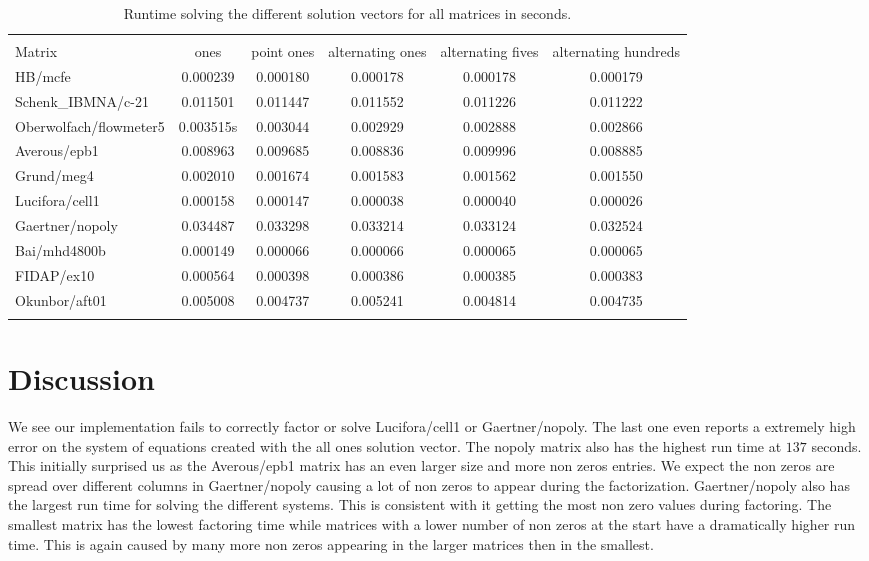 \documentclass[10pt]{article}
\begin{document}
\begin{table}
    \begin{tabular}{ l c c c c c }
    \firsthline
    \multicolumn{6}{c}{Solving Run time} \\
    \cline{2-6}
    Matrix & ones & point ones & alternating ones & alternating fives & alternating hundreds \\
    \hline
    HB/mcfe & 0.000239 & 0.000180 & 0.000178 & 0.000178 & 0.000179 \\
    Schenk\_IBMNA/c-21 & 0.011501 & 0.011447 & 0.011552 & 0.011226 & 0.011222 \\
    Oberwolfach/flowmeter5 & 0.003515s & 0.003044 & 0.002929 & 0.002888 & 0.002866 \\
    Averous/epb1 & 0.008963 & 0.009685 & 0.008836 & 0.009996 & 0.008885 \\
    Grund/meg4 & 0.002010 & 0.001674 & 0.001583 & 0.001562 & 0.001550 \\
    Lucifora/cell1 & 0.000158 & 0.000147 & 0.000038 & 0.000040 & 0.000026 \\
    Gaertner/nopoly & 0.034487 & 0.033298 & 0.033214 & 0.033124 & 0.032524 \\
    Bai/mhd4800b & 0.000149 & 0.000066 & 0.000066 & 0.000065 & 0.000065 \\
    FIDAP/ex10 & 0.000564 & 0.000398 & 0.000386 & 0.000385 & 0.000383 \\
    Okunbor/aft01 & 0.005008 & 0.004737 & 0.005241 & 0.004814 & 0.004735 \\
    \lasthline
    \end{tabular}
    \caption{Runtime solving the different solution vectors for all matrices in seconds.}
    \label{tab:solving}
\end{table}

\section{Discussion}
We see our implementation fails to correctly factor or solve Lucifora/cell1 or Gaertner/nopoly. The last one even reports a extremely high error on the system of equations created with the all ones solution vector. The nopoly matrix also has the highest run time at $137$ seconds. This initially surprised us as the Averous/epb1 matrix has an even larger size and more non zeros entries. We expect the non zeros are spread over different columns in Gaertner/nopoly causing a lot of non zeros to appear during the factorization. Gaertner/nopoly also has the largest run time for solving the different systems. This is consistent with it getting the most non zero values during factoring. The smallest matrix has the lowest factoring time while matrices with a lower number of non zeros at the start have a dramatically higher run time. This is again caused by many more non zeros appearing in the larger matrices then in the smallest.
\end{document}
